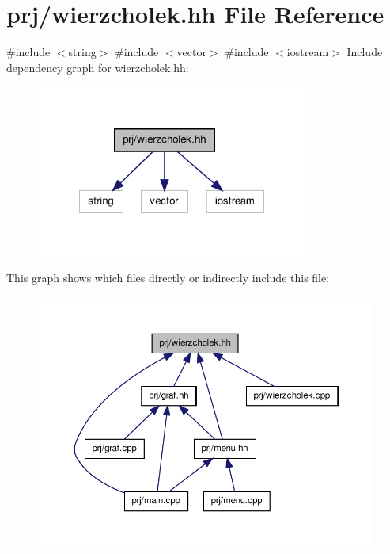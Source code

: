 \hypertarget{wierzcholek_8hh}{\section{prj/wierzcholek.hh \-File \-Reference}
\label{wierzcholek_8hh}
}
{\ttfamily \#include $<$string$>$}\*
{\ttfamily \#include $<$vector$>$}\*
{\ttfamily \#include $<$iostream$>$}\*
\-Include dependency graph for wierzcholek.\-hh\-:\nopagebreak
\begin{figure}[H]
\begin{center}
\leavevmode
\includegraphics[width=254pt]{wierzcholek_8hh__incl}
\end{center}
\end{figure}
\-This graph shows which files directly or indirectly include this file\-:\nopagebreak
\begin{figure}[H]
\begin{center}
\leavevmode
\includegraphics[width=350pt]{wierzcholek_8hh__dep__incl}
\end{center}
\end{figure}
